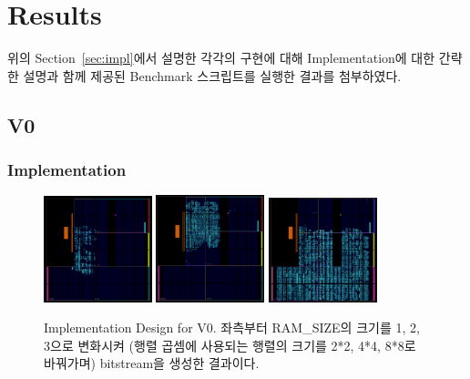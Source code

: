 \documentclass{article}
\begin{document}
\newpage
\section{Results}
위의 Section~\ref{sec:impl}에서 설명한 각각의 구현에 대해 Implementation에 대한 간략한 설명과 함께 제공된 Benchmark 스크립트를 실행한 결과를 첨부하였다.

\subsection{V0}
\subsubsection{Implementation}
\begin{figure}[htb!]
	\centering
	\includegraphics[width=0.28\textwidth]{fig/V0/impl_2.png}
	\includegraphics[width=0.28\textwidth]{fig/V0/impl_4.png}
	\includegraphics[width=0.28\textwidth]{fig/V0/impl_8.png}
\caption{Implementation Design for V0. 좌측부터 RAM\_SIZE의 크기를 1, 2, 3으로 변화시켜 (행렬 곱셈에 사용되는 행렬의 크기를 2*2, 4*4, 8*8로 바꿔가며) bitstream을 생성한 결과이다. }
\label{impl_v0}
\end{figure}
\end{document}

